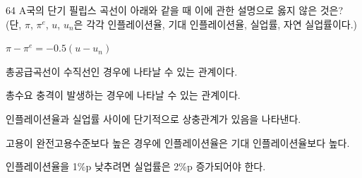 \begin{question}{64}
A국의 단기 필립스 곡선이 아래와 같을 때 이에 관한 설명으로 옳지 않은 것은? (단, $\pi$, $\pi^e$, $u$, $u_n$은 각각 인플레이션율, 기대 인플레이션율, 실업률, 자연 실업률이다.)
\begin{framedtext}
$\pi - \pi^e = -0.5(u - u_n)$
\end{framedtext}
\begin{choices}
  \item 총공급곡선이 수직선인 경우에 나타날 수 있는 관계이다.
  \item 총수요 충격이 발생하는 경우에 나타날 수 있는 관계이다.
  \item 인플레이션율과 실업률 사이에 단기적으로 상충관계가 있음을 나타낸다.
  \item 고용이 완전고용수준보다 높은 경우에 인플레이션율은 기대 인플레이션율보다 높다.
  \item 인플레이션율을 1\%p 낮추려면 실업률은 2\%p 증가되어야 한다.
\end{choices}
\end{question}
